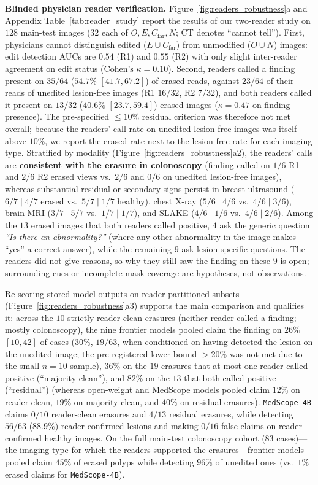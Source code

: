 \documentclass[5p,times,twocolumn,authoryear]{elsarticle}
\begin{document}
\textbf{Blinded physician reader verification.} Figure~\ref{fig:readers_robustness}a and Appendix Table~\ref{tab:reader_study} report the results of our two-reader study on $128$ main-test images ($32$ each of $O, E, C_{\text{far}}, N$; CT denotes ``cannot tell''). First, physicians cannot distinguish edited ($E \cup C_{\text{far}}$) from unmodified ($O \cup N$) images: edit detection AUCs are $0.54$ (R1) and $0.55$ (R2) with only slight inter-reader agreement on edit status ($\text{Cohen's }\kappa = 0.10$). Second, readers called a finding present on $35/64$ ($54.7\%$ $[41.7, 67.2]$) of erased reads, against $23/64$ of their reads of unedited lesion-free images (R1 $16/32$, R2 $7/32$), and both readers called it present on $13/32$ ($40.6\%$ $[23.7, 59.4]$) erased images ($\kappa = 0.47$ on finding presence). The pre-specified $\le 10\%$ residual criterion was therefore not met overall; because the readers' call rate on unedited lesion-free images was itself above $10\%$, we report the erased rate next to the lesion-free rate for each imaging type. Stratified by modality (Figure~\ref{fig:readers_robustness}a2), the readers' calls are \textbf{consistent with the erasure in colonoscopy} (finding called on $1/6$ R1 and $2/6$ R2 erased views vs.\ $2/6$ and $0/6$ on unedited lesion-free images), whereas substantial residual or secondary signs persist in breast ultrasound ($6/7 \mid 4/7$ erased vs.\ $5/7 \mid 1/7$ healthy), chest X-ray ($5/6 \mid 4/6$ vs.\ $4/6 \mid 3/6$), brain MRI ($3/7 \mid 5/7$ vs.\ $1/7 \mid 1/7$), and SLAKE ($4/6 \mid 1/6$ vs.\ $4/6 \mid 2/6$). Among the $13$ erased images that both readers called positive, $4$ ask the generic question \emph{``Is there an abnormality?''} (where any other abnormality in the image makes ``yes'' a correct answer), while the remaining $9$ ask lesion-specific questions. The readers did not give reasons, so why they still saw the finding on these $9$ is open; surrounding cues or incomplete mask coverage are hypotheses, not observations.

Re-scoring stored model outputs on reader-partitioned subsets (Figure~\ref{fig:readers_robustness}a3) supports the main comparison and qualifies it: across the $10$ strictly reader-clean erasures (neither reader called a finding; mostly colonoscopy), the nine frontier models pooled claim the finding on $26\%$ $[10, 42]$ of cases ($30\%$, $19/63$, when conditioned on having detected the lesion on the unedited image; the pre-registered lower bound $>20\%$ was not met due to the small $n=10$ sample), $36\%$ on the $19$ erasures that at most one reader called positive (``majority-clean''), and $82\%$ on the $13$ that both called positive (``residual'') (whereas open-weight and MedScope models pooled claim $12\%$ on reader-clean, $19\%$ on majority-clean, and $40\%$ on residual erasures). \texttt{MedScope-4B} claims $0/10$ reader-clean erasures and $4/13$ residual erasures, while detecting $56/63$ ($88.9\%$) reader-confirmed lesions and making $0/16$ false claims on reader-confirmed healthy images. On the full main-test colonoscopy cohort ($83$ cases)---the imaging type for which the readers supported the erasures---frontier models pooled claim $45\%$ of erased polyps while detecting $96\%$ of unedited ones (vs.\ $1\%$ erased claims for \texttt{MedScope-4B}).
\end{document}
